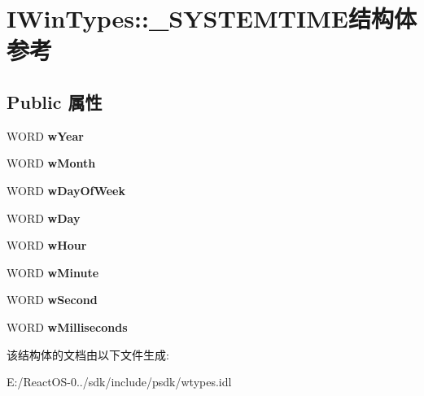 \hypertarget{struct_i_win_types_1_1___s_y_s_t_e_m_t_i_m_e}{}\section{I\+Win\+Types\+:\+:\+\_\+\+S\+Y\+S\+T\+E\+M\+T\+I\+M\+E结构体 参考}
\label{struct_i_win_types_1_1___s_y_s_t_e_m_t_i_m_e}
\subsection*{Public 属性}
\begin{DoxyCompactItemize}
\item 
\mbox{\label{struct_i_win_types_1_1___s_y_s_t_e_m_t_i_m_e_a0880af755cd85eb1ddc9e48c76d4e1a7}} 
W\+O\+RD {\bfseries w\+Year}
\item 
\mbox{\label{struct_i_win_types_1_1___s_y_s_t_e_m_t_i_m_e_a2d43d6363f12f57c0a2a34ca48002591}} 
W\+O\+RD {\bfseries w\+Month}
\item 
\mbox{\label{struct_i_win_types_1_1___s_y_s_t_e_m_t_i_m_e_ab152d4017d43f61fb07a2d45dbc4bf8b}} 
W\+O\+RD {\bfseries w\+Day\+Of\+Week}
\item 
\mbox{\label{struct_i_win_types_1_1___s_y_s_t_e_m_t_i_m_e_af41adb5032339ade2ebcee53f2537550}} 
W\+O\+RD {\bfseries w\+Day}
\item 
\mbox{\label{struct_i_win_types_1_1___s_y_s_t_e_m_t_i_m_e_ac308d00c0e9888dc62866c2bda45c2ec}} 
W\+O\+RD {\bfseries w\+Hour}
\item 
\mbox{\label{struct_i_win_types_1_1___s_y_s_t_e_m_t_i_m_e_a3ebc8a2bcca01b1dfef13b87c8561881}} 
W\+O\+RD {\bfseries w\+Minute}
\item 
\mbox{\label{struct_i_win_types_1_1___s_y_s_t_e_m_t_i_m_e_af701cfba99ce48fd12e0df26c2fe9404}} 
W\+O\+RD {\bfseries w\+Second}
\item 
\mbox{\label{struct_i_win_types_1_1___s_y_s_t_e_m_t_i_m_e_ad1425bf81bb55dd83963137b9d97944f}} 
W\+O\+RD {\bfseries w\+Milliseconds}
\end{DoxyCompactItemize}


该结构体的文档由以下文件生成\+:\begin{DoxyCompactItemize}
\item 
E\+:/\+React\+O\+S-\/0../sdk/include/psdk/wtypes.\+idl\end{DoxyCompactItemize}
